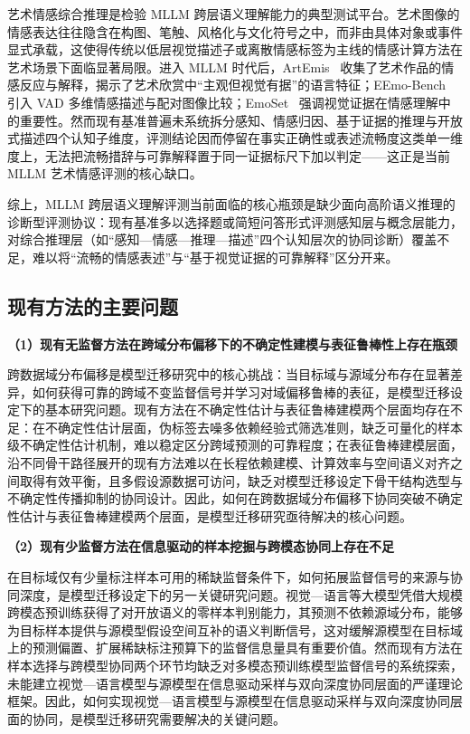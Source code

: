 艺术情感综合推理是检验 MLLM 跨层语义理解能力的典型测试平台。艺术图像的情感表达往往隐含在构图、笔触、风格化与文化符号之中，而非由具体对象或事件显式承载，这使得传统以低层视觉描述子或离散情感标签为主线的情感计算方法在艺术场景下面临显著局限。进入 MLLM 时代后，ArtEmis~\cite{achlioptas2021artemis} 收集了艺术作品的情感反应与解释，揭示了艺术欣赏中“主观但视觉有据”的语言特征；EEmo-Bench~\cite{eemobench2025} 引入 VAD 多维情感描述与配对图像比较；EmoSet~\cite{yang2023emoset} 强调视觉证据在情感理解中的重要性。然而现有基准普遍未系统拆分感知、情感归因、基于证据的推理与开放式描述四个认知子维度，评测结论因而停留在事实正确性或表述流畅度这类单一维度上，无法把流畅措辞与可靠解释置于同一证据标尺下加以判定——这正是当前 MLLM 艺术情感评测的核心缺口。

综上，MLLM 跨层语义理解评测当前面临的核心瓶颈是缺少面向高阶语义推理的诊断型评测协议：现有基准多以选择题或简短问答形式评测感知层与概念层能力，对综合推理层（如“感知—情感—推理—描述”四个认知层次的协同诊断）覆盖不足，难以将“流畅的情感表述”与“基于视觉证据的可靠解释”区分开来。

\subsection{现有方法的主要问题}

\noindent\textbf{（1）现有无监督方法在跨域分布偏移下的不确定性建模与表征鲁棒性上存在瓶颈}

跨数据域分布偏移是模型迁移研究中的核心挑战：当目标域与源域分布存在显著差异，如何获得可靠的跨域不变监督信号并学习对域偏移鲁棒的表征，是模型迁移设定下的基本研究问题。现有方法在不确定性估计与表征鲁棒建模两个层面均存在不足：在不确定性估计层面，伪标签去噪多依赖经验式筛选准则，缺乏可量化的样本级不确定性估计机制，难以稳定区分跨域预测的可靠程度；在表征鲁棒建模层面，沿不同骨干路径展开的现有方法难以在长程依赖建模、计算效率与空间语义对齐之间取得有效平衡，且多假设源数据可访问，缺乏对模型迁移设定下骨干结构选型与不确定性传播抑制的协同设计。因此，如何在跨数据域分布偏移下协同突破不确定性估计与表征鲁棒建模两个层面，是模型迁移研究亟待解决的核心问题。

\noindent\textbf{（2）现有少监督方法在信息驱动的样本挖掘与跨模态协同上存在不足}

在目标域仅有少量标注样本可用的稀缺监督条件下，如何拓展监督信号的来源与协同深度，是模型迁移设定下的另一关键研究问题。视觉—语言等大模型凭借大规模跨模态预训练获得了对开放语义的零样本判别能力，其预测不依赖源域分布，能够为目标样本提供与源模型假设空间互补的语义判断信号，这对缓解源模型在目标域上的预测偏置、扩展稀缺标注预算下的监督信息量具有重要价值。然而现有方法在样本选择与跨模型协同两个环节均缺乏对多模态预训练模型监督信号的系统探索，未能建立视觉—语言模型与源模型在信息驱动采样与双向深度协同层面的严谨理论框架。因此，如何实现视觉—语言模型与源模型在信息驱动采样与双向深度协同层面的协同，是模型迁移研究需要解决的关键问题。

